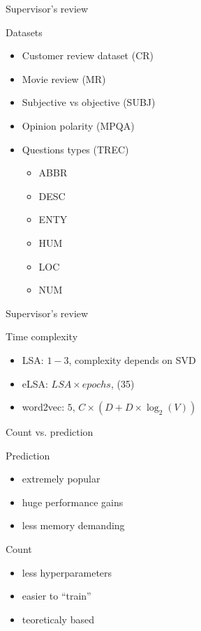 \documentclass[xcolor={table}]{beamer}
\begin{document}
\begin{frame}{Supervisor's review}
    \begin{block}{Datasets}
        \begin{itemize}
            \item Customer review dataset (CR)
            \item Movie review (MR)
            \item Subjective vs objective (SUBJ)
            \item Opinion polarity (MPQA)
            \item Questions types (TREC)
            \begin{itemize}
                \item ABBR  
                \item DESC  
                \item ENTY  
                \item HUM   
                \item LOC  
                \item NUM
            \end{itemize}
        \end{itemize}            
    \end{block}
\end{frame}

\begin{frame}{Supervisor's review}
    \begin{block}{Time complexity}
        \begin{itemize}
            \item LSA: $1-3$, complexity depends on SVD
            \item eLSA: $LSA \times epochs$, (35)
            \item word2vec: $5$, $C \times (D + D \times \log_2(V))$
        \end{itemize}
    \end{block}
\end{frame}



\begin{frame}{Count vs. prediction}
    \begin{block}{Prediction}
        \begin{itemize}
            \item extremely popular
            \item huge performance gains
            \item less memory demanding
        \end{itemize}
    \end{block}

    \begin{block}{Count}
        \begin{itemize}
            \item less hyperparameters
            \item easier to ``train''
            \item teoreticaly based
        \end{itemize}
    \end{block}
\end{frame}
\end{document}
